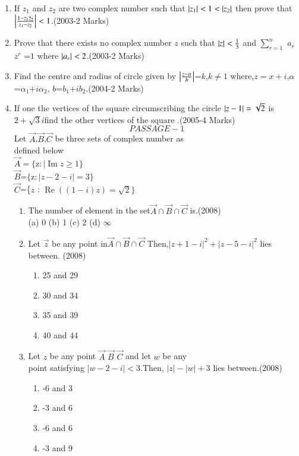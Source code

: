 \documentclass[journal]{IEEEtran}
\begin{document}
\begin{enumerate}[start=7]
\item If $z_1$ and $z_2$ are two  complex number such that $\left\vert z_1\right\vert<1<\left\vert z_2\right\vert$ then prove that  $\left\vert\frac{1-z_1 \bar z_2}{z_1-z_2}\right\vert<1$.\hfill(2003-2 Marks)\\
\item Prove that there exists no complex number $z$ such that $\left\vert z\right\vert<\frac{1}{3}$ and $\sum_{r=1}^{n}$ $a_r$ $z^r$ =$1$ where $\left\vert a_r\right\vert<2$.\hfill (2003-2 Marks)\\
\item Find the centre and radius  of circle given by $\left\vert\frac{z-\alpha} b\right\vert$=$k$,$k\not=1$ where,$z=x+i$,$\alpha$=$\alpha_1$+$i\alpha_2$,
$b$=$b_1$+$ib_2$.\hfill(2004-2 Marks) \\  \item If one the vertices of the square circumscribing the circle $\left\vert z-1\right\vert = \sqrt{2}$ is $2 +\sqrt{3}i$find the other vertices of the square .\hfill (2005-4 Marks) \\
$$PASSAGE-1$$
Let $\vec{A}$,$\vec{B}$,$\vec{C}$ be three sets of complex number as\\ defined below\\$\vec{A} = \{ $z$ :\mid \operatorname{Im}z\geq1\}$\\$\vec{B}$=$\{$z$:|z-2-i|=3\}$\\$\vec{C}$=\{$z$ : $\operatorname{Re} \left((1-i)z\right) = \sqrt{2} \}$\\
\begin{enumerate}     
\item The number of element in the set$\vec{A} \cap\vec{B} \cap\vec{C} $ is.\hfill (2008)\\
   (a) 0 \hfill
   (b) 1 \hfill
   (c) 2 \hfill
   (d) $\infty$\\
\item Let $\vec{z}$ be any point in$ \vec{A}\cap\vec{B}\cap\vec{C} $ Then,$|z+1-i|^2+|z-5-i|^2$ lies between. \hfill  (2008) 
\begin{multicols}{2}
    \begin{enumerate}
        \item 25 and 29
        \item 30 and 34
        \item 35 and 39
        \item 40 and 44
    \end{enumerate}
\end{multicols}
\item  Let $z$ be any point $\vec{A}$ $\vec{B}$ $\vec{C}$ and let $w$ be any\\point satisfying $|w-2-i|<3$.Then, $|z|-|w|+3$ lies between.\hfill (2008) 
 \begin{multicols}{2}
  \begin{enumerate}
    \item -6 and 3
    \item -3 and 6 
    \item -6 and 6
    \item -3 and 9
  \end{enumerate}
 \end{multicols}
\end{enumerate}
\end{enumerate}
\end{document}
